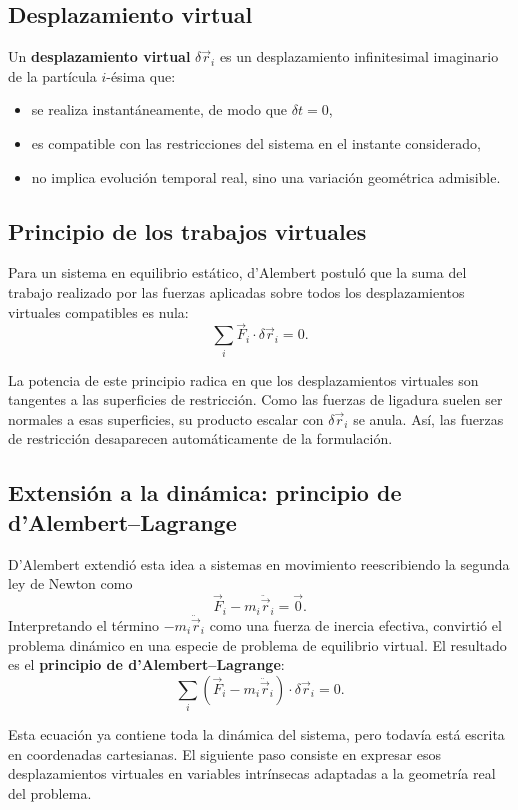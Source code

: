 \subsection{Desplazamiento virtual}
Un \textbf{desplazamiento virtual} \(\delta\vec{r}_i\) es un desplazamiento infinitesimal imaginario de la partícula \(i\)-ésima que:
\begin{itemize}
    \item se realiza instantáneamente, de modo que \(\delta t = 0\),
    \item es compatible con las restricciones del sistema en el instante considerado,
    \item no implica evolución temporal real, sino una variación geométrica admisible.
\end{itemize}

\subsection{Principio de los trabajos virtuales}
Para un sistema en equilibrio estático, d'Alembert postuló que la suma del trabajo realizado por las fuerzas aplicadas sobre todos los desplazamientos virtuales compatibles es nula:
\[
\sum_i \vec{F}_i \cdot \delta\vec{r}_i = 0.
\]

La potencia de este principio radica en que los desplazamientos virtuales son tangentes a las superficies de restricción. Como las fuerzas de ligadura suelen ser normales a esas superficies, su producto escalar con \(\delta\vec{r}_i\) se anula. Así, las fuerzas de restricción desaparecen automáticamente de la formulación.

\subsection{Extensión a la dinámica: principio de d'Alembert--Lagrange}
D'Alembert extendió esta idea a sistemas en movimiento reescribiendo la segunda ley de Newton como
\[
\vec{F}_i - m_i\ddot{\vec{r}}_i = \vec{0}.
\]
Interpretando el término \(-m_i\ddot{\vec{r}}_i\) como una fuerza de inercia efectiva, convirtió el problema dinámico en una especie de problema de equilibrio virtual. El resultado es el \textbf{principio de d'Alembert--Lagrange}:
\[
\sum_i \left(\vec{F}_i - m_i\ddot{\vec{r}}_i\right)\cdot\delta\vec{r}_i = 0.
\]

Esta ecuación ya contiene toda la dinámica del sistema, pero todavía está escrita en coordenadas cartesianas. El siguiente paso consiste en expresar esos desplazamientos virtuales en variables intrínsecas adaptadas a la geometría real del problema.

